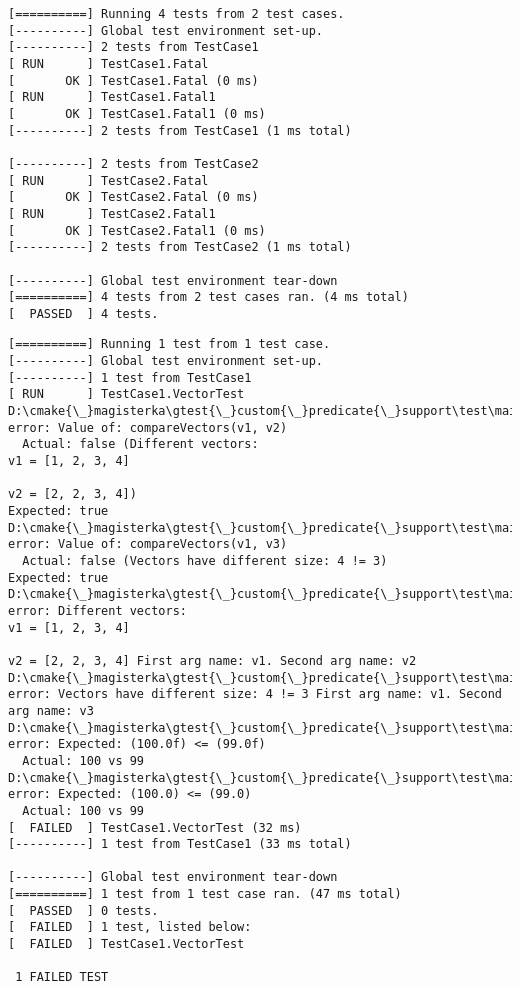 \documentclass[12pt,a4paper,notitlepage]{report}
\begin{document}
		\begin{lstlisting}[label=some-code,caption=Listing programu rysującego model jajka w 3D]
[==========] Running 4 tests from 2 test cases.
[----------] Global test environment set-up.
[----------] 2 tests from TestCase1
[ RUN      ] TestCase1.Fatal
[       OK ] TestCase1.Fatal (0 ms)
[ RUN      ] TestCase1.Fatal1
[       OK ] TestCase1.Fatal1 (0 ms)
[----------] 2 tests from TestCase1 (1 ms total)

[----------] 2 tests from TestCase2
[ RUN      ] TestCase2.Fatal
[       OK ] TestCase2.Fatal (0 ms)
[ RUN      ] TestCase2.Fatal1
[       OK ] TestCase2.Fatal1 (0 ms)
[----------] 2 tests from TestCase2 (1 ms total)

[----------] Global test environment tear-down
[==========] 4 tests from 2 test cases ran. (4 ms total)
[  PASSED  ] 4 tests.
		\end{lstlisting}

		\begin{lstlisting}[label=some-code,caption=Listing programu rysującego model jajka w 3D]
[==========] Running 1 test from 1 test case.
[----------] Global test environment set-up.
[----------] 1 test from TestCase1
[ RUN      ] TestCase1.VectorTest
D:\cmake{\_}magisterka\gtest{\_}custom{\_}predicate{\_}support\test\main.cpp(63): error: Value of: compareVectors(v1, v2)
  Actual: false (Different vectors:
v1 = [1, 2, 3, 4]

v2 = [2, 2, 3, 4])
Expected: true
D:\cmake{\_}magisterka\gtest{\_}custom{\_}predicate{\_}support\test\main.cpp(64): error: Value of: compareVectors(v1, v3)
  Actual: false (Vectors have different size: 4 != 3)
Expected: true
D:\cmake{\_}magisterka\gtest{\_}custom{\_}predicate{\_}support\test\main.cpp(67): error: Different vectors:
v1 = [1, 2, 3, 4]

v2 = [2, 2, 3, 4] First arg name: v1. Second arg name: v2
D:\cmake{\_}magisterka\gtest{\_}custom{\_}predicate{\_}support\test\main.cpp(68): error: Vectors have different size: 4 != 3 First arg name: v1. Second arg name: v3
D:\cmake{\_}magisterka\gtest{\_}custom{\_}predicate{\_}support\test\main.cpp(70): error: Expected: (100.0f) <= (99.0f)
  Actual: 100 vs 99
D:\cmake{\_}magisterka\gtest{\_}custom{\_}predicate{\_}support\test\main.cpp(71): error: Expected: (100.0) <= (99.0)
  Actual: 100 vs 99
[  FAILED  ] TestCase1.VectorTest (32 ms)
[----------] 1 test from TestCase1 (33 ms total)

[----------] Global test environment tear-down
[==========] 1 test from 1 test case ran. (47 ms total)
[  PASSED  ] 0 tests.
[  FAILED  ] 1 test, listed below:
[  FAILED  ] TestCase1.VectorTest

 1 FAILED TEST
		\end{lstlisting}
\end{document}
